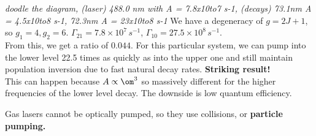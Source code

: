 \documentclass[a4paper, 11pt, normalem]{report}
\begin{document}
\begin{example}
    \begin{figure}
        \centering
    \end{figure}
    \textit{doodle the diagram, (laser) 488.0 nm with A = 7.8x10to7 s-1, (decays) 73.1nm A = 4.5x10to8 s-1, 72.3nm A = 23x10to8 s-1}
    We have a degeneracy of $g = 2J+1$, so $g_1 = 4, g_2 = 6$.
    $\Gamma_{21} = 7.8\times10^7\,s^{-1}$, $\Gamma_{10}=27.5\times10^8\,s^{-1}$.\\
    From this, we get a ratio of $0.044$.
    For this particular system, we can pump into the lower level 22.5 times as quickly as into the upper one and still maintain population inversion due to fast natural decay rates.
    \textbf{Striking result!}\\
    This can happen because $A \propto \om^3$ so massively different for the higher frequencies of the lower level decay.
    The downside is low quantum efficiency.
\end{example}
Gas lasers cannot be optically pumped, so they use collisions, or \textbf{particle pumping.}
\end{document}

